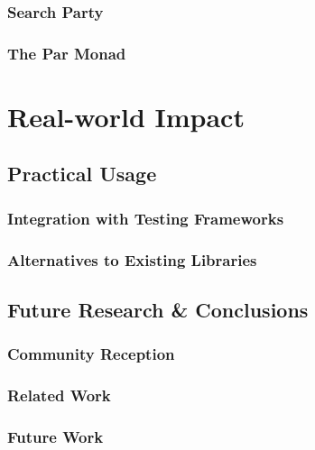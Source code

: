 \documentclass[openright, dottedtoc, headinclude, footinclude=true, a4paper, numbers=noenddot, fontsize=10pt]{scrreprt}
\begin{document}
  \section{Search Party}
  \label{sec:casestudies-searchparty}
  

  \section{The Par Monad}
  \label{sec:casestudies-parmonad}
  

\part{Real-world Impact}
\label{part:impact}

\null\clearpage
\chapter{Practical Usage}
\label{chap:practice}


  \section{Integration with Testing Frameworks}
  \label{sec:practice-integration}
  

  \section{Alternatives to Existing Libraries}
  \label{sec:practice-alternatives}
  

\null\clearpage

\chapter{Future Research \& Conclusions}
\label{chap:conclusions}


  \section{Community Reception}
  \label{sec:conclusions-reception}
  

  \section{Related Work}
  \label{sec:conclusions-related}
  

  \section{Future Work}
  \label{sec:conclusions-future}
  

\if@openright
  \cleardoublepage
\else
  \clearpage
\fi



\end{document}
